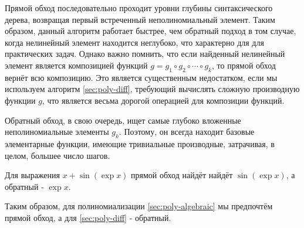 Прямой обход последовательно проходит уровни глубины синтаксического дерева, возвращая первый встреченный неполиномиальный элемент. Таким образом, данный алгоритм работает быстрее, чем обратный подход в том случае, когда  нелинейный элемент находится неглубоко, что характерно для для практических задач. Однако важно помнить, что если найденный нелинейный элемент является композицией функций $g = g_1 \circ g_2 \circ \cdots \circ g_k$, то прямой обход вернёт всю композицию. Это является существенным недостатком, если мы используем алгоритм \ref{sec:poly-diff}, требующий вычислять сложную производную функции $g$, что является весьма дорогой операцией для композиции функций.

Обратный обход, в свою очередь, ищет самые глубоко вложенные неполиномиальные элементы $g_k$. Поэтому, он всегда находит базовые элементарные функции, имеющие тривиальные производные, затрачивая, в целом, большее число шагов.    

\begin{example}
    Для выражения $x + \sin{(\exp{x})}$ прямой обход найдёт найдёт $\sin{(\exp{x})}$, а обратный - $\exp{x}$.
\end{example}

Таким образом, для полиномиализации \ref{sec:poly-algebraic} мы предпочтём прямой обход, а для \ref{sec:poly-diff} - обратный.
